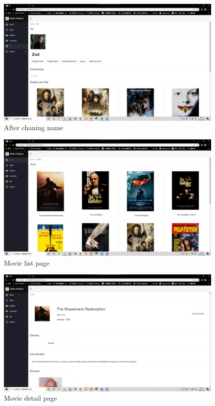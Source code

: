 \begin{CJK*}{UTF8}{gbsn}
\begin{figure}[htbp]
\centering
\includegraphics[width=1\textwidth]{res_name2.png}
\caption{After chaning name}
\end{figure}



\begin{figure}[htbp]
\centering
\includegraphics[width=1\textwidth]{res_movie1.png}
\caption{Movie list page}
\end{figure}



\begin{figure}[htbp]
\centering
\includegraphics[width=1\textwidth]{res_movie2.png}
\caption{Movie detail page}
\end{figure}



\end{CJK*}
